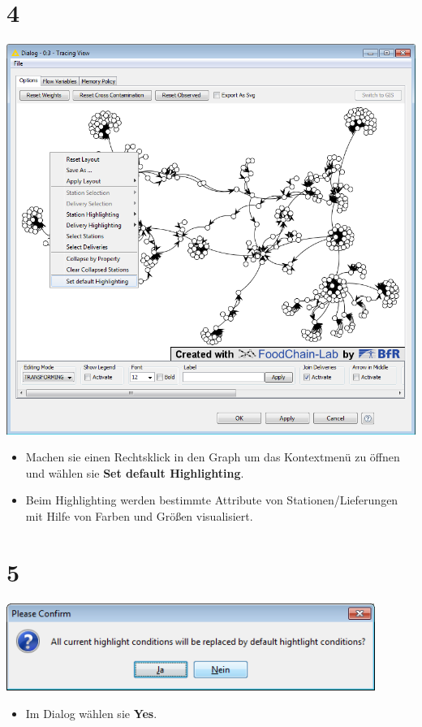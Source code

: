 \documentclass{beamer}
\begin{document}
\section{4}
\begin{frame}
	\begin{center}
  		\includegraphics[height=0.6\textheight]{4.png}
	\end{center}
	\begin{itemize}
		\item Machen sie einen Rechtsklick in den Graph um das Kontextmenü zu öffnen und wählen sie \textbf{Set default Highlighting}.
		\item Beim Highlighting werden bestimmte Attribute von Stationen/Lieferungen mit Hilfe von Farben und Größen visualisiert.
	\end{itemize}
\end{frame}

\section{5}
\begin{frame}
	\begin{center}
  		\includegraphics[width=0.9\textwidth]{5.png}
	\end{center}
	\begin{itemize}
		\item Im Dialog wählen sie \textbf{Yes}.
	\end{itemize}
\end{frame}
\end{document}
